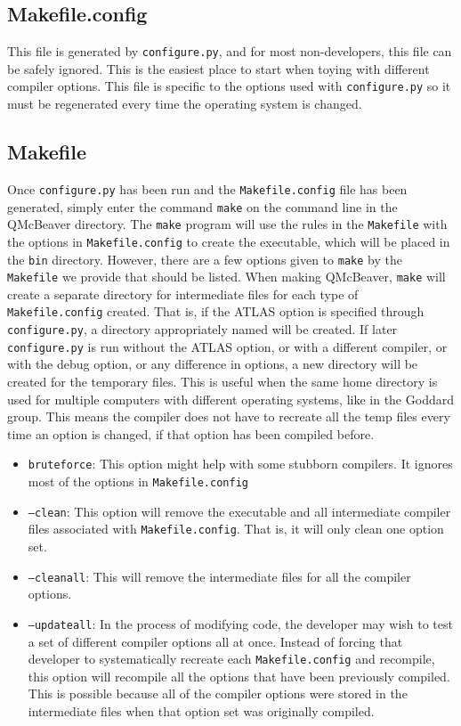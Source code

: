 \documentclass[11pt]{article}
\begin{document}
\subsection{Makefile.config}
This file is generated by {\tt configure.py}, and for most non-developers, this file can be safely ignored. This is the easiest place to start when toying with different compiler options. This file is specific to the options used with {\tt configure.py} so it must be regenerated every time the operating system is changed.

\subsection{Makefile}
Once {\tt configure.py} has been run and the {\tt Makefile.config} file has been generated, simply enter the command {\tt make} on the command line in the QMcBeaver directory. The {\tt make} program will use the rules in the {\tt Makefile} with the options in {\tt Makefile.config} to create the executable, which will be placed in the {\tt bin} directory. However, there are a few options given to {\tt make} by the {\tt Makefile} we provide that should be listed. When making QMcBeaver, {\tt make} will create a separate directory for intermediate files for each type of {\tt Makefile.config} created. That is, if the ATLAS option is specified through {\tt configure.py}, a directory appropriately named will be created. If later {\tt configure.py} is run without the ATLAS option, or with a different compiler, or with the debug option, or any difference in options, a new directory will be created for the temporary files. This is useful when the same home directory is used for multiple computers with different operating systems, like in the Goddard group. This means the compiler does not have to recreate all the temp files every time an option is changed, if that option has been compiled before.

\begin{itemize}
\item {\tt bruteforce}: This option might help with some stubborn compilers. It ignores most of the options in {\tt Makefile.config}
\item {\tt --clean}: This option will remove the executable and all intermediate compiler files associated with {\tt Makefile.config}. That is, it will only clean one option set.
\item {\tt --cleanall}: This will remove the intermediate files for all the compiler options.
\item {\tt --updateall}: In the process of modifying code, the developer may wish to test a set of different compiler options all at once. Instead of forcing that developer to systematically recreate each {\tt Makefile.config} and recompile, this option will recompile all the options that have been previously compiled. This is possible because all of the compiler options were stored in the intermediate files when that option set was originally compiled.
\end{itemize}
\end{document}
